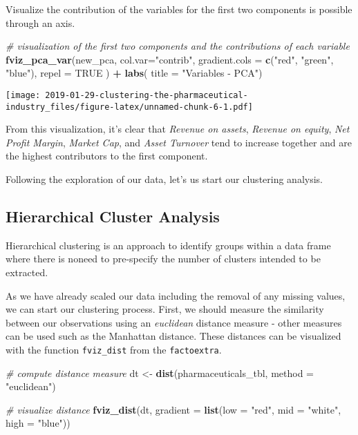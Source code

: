 \documentclass[]{article}
\newenvironment{Shaded}{\begin{snugshade}}{\end{snugshade}}
\newcommand{\KeywordTok}[1]{\textcolor[rgb]{0.13,0.29,0.53}{\textbf{#1}}}
\newcommand{\DataTypeTok}[1]{\textcolor[rgb]{0.13,0.29,0.53}{#1}}
\newcommand{\StringTok}[1]{\textcolor[rgb]{0.31,0.60,0.02}{#1}}
\newcommand{\CommentTok}[1]{\textcolor[rgb]{0.56,0.35,0.01}{\textit{#1}}}
\newcommand{\OtherTok}[1]{\textcolor[rgb]{0.56,0.35,0.01}{#1}}
\newcommand{\OperatorTok}[1]{\textcolor[rgb]{0.81,0.36,0.00}{\textbf{#1}}}
\newcommand{\NormalTok}[1]{#1}
\begin{document}
Visualize the contribution of the variables for the first two components
is possible through an axis.

\begin{Shaded}
\begin{Highlighting}[]
\CommentTok{# visualization of the first two components and the contributions of each variable}
\KeywordTok{fviz_pca_var}\NormalTok{(new_pca, }\DataTypeTok{col.var=}\StringTok{"contrib"}\NormalTok{,}
             \DataTypeTok{gradient.cols =} \KeywordTok{c}\NormalTok{(}\StringTok{"red"}\NormalTok{, }\StringTok{"green"}\NormalTok{, }\StringTok{"blue"}\NormalTok{),}
             \DataTypeTok{repel =} \OtherTok{TRUE} 
\NormalTok{             ) }\OperatorTok{+}\StringTok{ }
\StringTok{  }\KeywordTok{labs}\NormalTok{( }\DataTypeTok{title =} \StringTok{"Variables - PCA"}\NormalTok{)}
\end{Highlighting}
\end{Shaded}

\texttt{[image: 2019-01-29-clustering-the-pharmaceutical-industry\_files/figure-latex/unnamed-chunk-6-1.pdf]}

From this visualization, it's clear that \emph{Revenue on assets},
\emph{Revenue on equity}, \emph{Net Profit Margin}, \emph{Market Cap},
and \emph{Asset Turnover} tend to increase together and are the highest
contributors to the first component.

Following the exploration of our data, let's us start our clustering
analysis.

\subsection{Hierarchical Cluster
Analysis}\label{hierarchical-cluster-analysis}

Hierarchical clustering is an approach to identify groups within a data
frame where there is noneed to pre-specify the number of clusters
intended to be extracted.

As we have already scaled our data including the removal of any missing
values, we can start our clustering process. First, we should measure
the similarity between our observations using an \emph{euclidean}
distance measure - other measures can be used such as the Manhattan
distance. These distances can be visualized with the function
\texttt{fviz\_dist} from the \texttt{factoextra}.

\begin{Shaded}
\begin{Highlighting}[]
\CommentTok{# compute distance measure}
\NormalTok{dt <-}\StringTok{ }\KeywordTok{dist}\NormalTok{(pharmaceuticals_tbl, }\DataTypeTok{method =} \StringTok{"euclidean"}\NormalTok{)}


\CommentTok{# visualize distance}
\KeywordTok{fviz_dist}\NormalTok{(dt, }\DataTypeTok{gradient =} \KeywordTok{list}\NormalTok{(}\DataTypeTok{low =} \StringTok{"red"}\NormalTok{, }\DataTypeTok{mid =} \StringTok{"white"}\NormalTok{, }\DataTypeTok{high =} \StringTok{"blue"}\NormalTok{))}
\end{Highlighting}
\end{Shaded}
\end{document}

